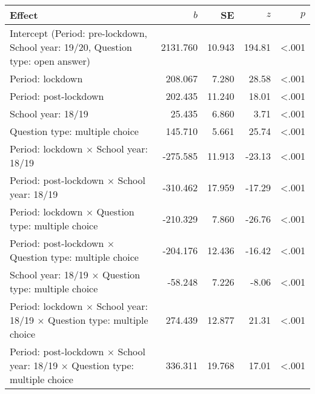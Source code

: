 
\begin{tabular}{lrrrr}
\toprule
Effect & $b$ & SE & $z$ & $p$\\
\midrule
Intercept \small{(Period: pre-lockdown, School year: 19/20, Question type: open answer)} & 2131.760 & 10.943 & 194.81 & <.001\\
Period: lockdown & 208.067 & 7.280 & 28.58 & <.001\\
Period: post-lockdown & 202.435 & 11.240 & 18.01 & <.001\\
School year: 18/19 & 25.435 & 6.860 & 3.71 & <.001\\
Question type: multiple choice & 145.710 & 5.661 & 25.74 & <.001\\
\addlinespace
Period: lockdown $\times$ School year: 18/19 & -275.585 & 11.913 & -23.13 & <.001\\
Period: post-lockdown $\times$ School year: 18/19 & -310.462 & 17.959 & -17.29 & <.001\\
Period: lockdown $\times$ Question type: multiple choice & -210.329 & 7.860 & -26.76 & <.001\\
Period: post-lockdown $\times$ Question type: multiple choice & -204.176 & 12.436 & -16.42 & <.001\\
School year: 18/19 $\times$ Question type: multiple choice & -58.248 & 7.226 & -8.06 & <.001\\
\addlinespace
Period: lockdown $\times$ School year: 18/19 $\times$ Question type: multiple choice & 274.439 & 12.877 & 21.31 & <.001\\
Period: post-lockdown $\times$ School year: 18/19 $\times$ Question type: multiple choice & 336.311 & 19.768 & 17.01 & <.001\\
\bottomrule
\end{tabular}